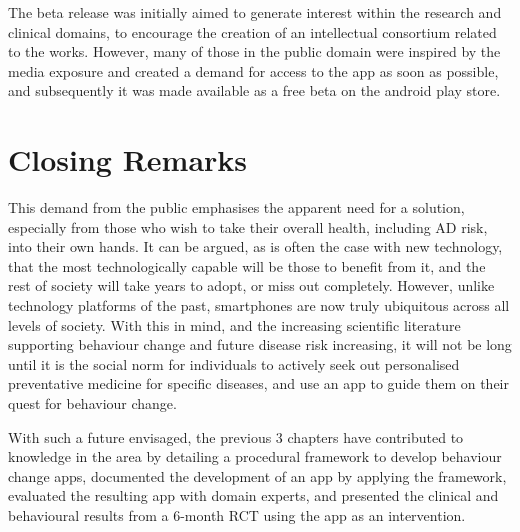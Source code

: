The beta release was initially aimed to generate interest within the research and clinical domains, to encourage the creation of an intellectual consortium related to the works. However, many of those in the public domain were inspired by the media exposure and created a demand for access to the app as soon as possible, and subsequently it was made available as a free beta on the android play store.

\section{Closing Remarks}
This demand from the public emphasises the apparent need for a solution, especially from those who wish to take their overall health, including AD risk, into their own hands. It can be argued, as is often the case with new technology, that the most technologically capable will be those to benefit from it, and the rest of society will take years to adopt, or miss out completely. However, unlike technology platforms of the past, smartphones are now truly ubiquitous across all levels of society. With this in mind, and the increasing scientific literature supporting behaviour change and future disease risk increasing, it will not be long until it is the social norm for individuals to actively seek out personalised preventative medicine for specific diseases, and use an app to guide them on their quest for behaviour change.

With such a future envisaged, the previous 3 chapters have contributed to knowledge in the area by detailing a procedural framework to develop behaviour change apps, documented the development of an app by applying the framework, evaluated the resulting app with domain experts, and presented the clinical and behavioural results from a 6-month RCT using the app as an  intervention.
